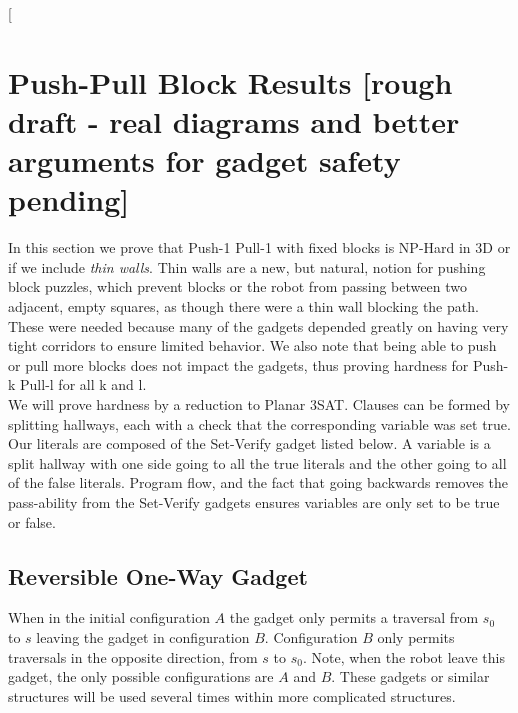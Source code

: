 \documentclass[11pt]{article}
\makeatletter
\gdef\xxx{\@ifnextchar[\xxx@lab\xxx@nolab}
\makeatother
\begin{document}
\xxx{might be more updating, check 6.890}


\section{Push-Pull Block Results  [rough draft - real diagrams and better arguments for gadget safety pending]}
In this section we prove that Push-1 Pull-1 with fixed blocks is NP-Hard in 3D or if we include \emph{thin walls}. Thin walls are a new, but natural, notion for pushing block puzzles, which prevent blocks or the robot from passing between two adjacent, empty squares, as though there were a thin wall blocking the path. These were needed because many of the gadgets depended greatly on having very tight corridors to ensure limited behavior. We also note that being able to push or pull more blocks does not impact the gadgets, thus proving hardness for Push-k Pull-l for all k and l. \\
We will prove hardness by a reduction to Planar 3SAT. Clauses can be formed by splitting hallways, each with a check that the corresponding variable was set true. Our literals are composed of the Set-Verify gadget listed below. A variable is a split hallway with one side going to all the true literals and the other going to all of the false literals. Program flow, and the fact that going backwards removes the pass-ability from the Set-Verify gadgets ensures variables are only set to be true or false.

\subsection{Reversible One-Way Gadget}
When in the initial configuration $A$ the gadget only permits a traversal from $s_0$ to $s$ leaving the gadget in configuration $B$. Configuration $B$ only permits traversals in the opposite direction, from $s$ to $s_0$. Note, when the robot leave this gadget, the only possible configurations are $A$ and $B$. These gadgets or similar structures will be used several times within more complicated structures.
\end{document}
